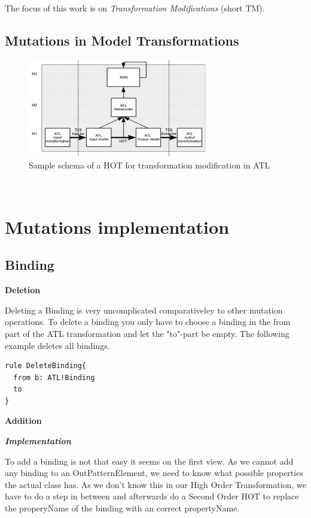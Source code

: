\documentclass{llncs}
\begin{document}
The focus of this work is on \textit{Transformation Modifications} (short TM). 

\subsection{Mutations in Model Transformations}

\begin{figure}[tb]
	\centering
	\includegraphics[width=0.7\textwidth,natwidth=610,natheight=642]{figures/HOT.png}
	\caption{Sample schema of a HOT for transformation modification in ATL}
	\label{fig:samplefigure_pdf}
\end{figure}~\cite{misc:ModelingLanguages}

\section{Mutations implementation}

\subsection{Binding}

\textbf{Deletion}

Deleting a Binding is very uncomplicated comparativeley to other mutation operations.
To delete a binding you only have to choose a binding in the from part of the ATL transformation and let the "to"-part be empty.
The following example deletes  all bindings.

\begin{lstlisting}
rule DeleteBinding{
  from b: ATL!Binding
  to
}
\end{lstlisting}

\textbf{Addition}

\textbf\textit{{Implementation}}

To add a binding is not that easy it seems on the first view.
As we cannot add any binding to an OutPatternElement, we need to know what possible properties the actual class has.
As we don't know this in our High Order Transformation, we have to do a step in between and afterwards do a Second Order HOT to replace the properyName of the binding with an correct propertyName.
\end{document}
